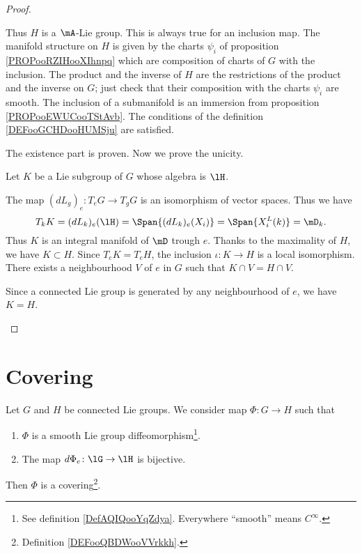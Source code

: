 \begin{theorem}
\begin{proof}
\begin{subproof}
		Thus \( H\) is a \( \mA\)-Lie group.
		This is always true for an inclusion map.
		The manifold structure on \( H\) is given by the charts \( \psi_i\) of proposition \ref{PROPooRZIHooXIhnpq} which are composition of charts of \( G\) with the inclusion. The product and the inverse of \( H\) are the restrictions of the product and the inverse on \( G\); just check that their composition with the charts \( \psi_i\) are smooth.
		The inclusion of a submanifold is an immersion from proposition \ref{PROPooEWUCooTStAvb}.
		The conditions of the definition \ref{DEFooGCHDooHUMSju} are satisfied.
	\end{subproof}
	The existence part is proven. Now we prove the unicity.

	Let \( K\) be a Lie subgroup of \( G\) whose algebra is \( \lH\).
	\begin{subproof}
		\spitem[\( T_kK=\mD_k\)]
		The map \( (dL_g)_e\colon T_eG\to T_gG\) is an isomorphism of vector spaces. Thus we have
		\begin{equation}
			T_kK=(dL_k)_e(\lH)=\Span\{ (dL_k)_e(X_i) \}=\Span\{ X_i^L(k) \}=\mD_k.
		\end{equation}
		\spitem[Maximality]
		Thus \( K\) is an integral manifold of \( \mD\) trough \( e\). Thanks to the maximality of \( H\), we have \( K\subset H\). Since \( T_eK=T_eH\), the inclusion \( \iota\colon K\to H\) is a local isomorphism. There exists a neighbourhood \( V\) of \( e\) in \( G\) such that \( K\cap V=H\cap V\).

		Since a connected Lie group is generated by any neighbourhood of \( e\), we have \( K=H\).
	\end{subproof}
\end{proof}


\section{Covering}

\begin{lemma}     \label{LEMooSYVQooTjkgBL}
	Let \( G\) and \( H\) be connected Lie groups. We consider map \( \Phi\colon G\to H\) such that
	\begin{enumerate}
		\item
		      \( \Phi\) is a smooth Lie group diffeomorphism\footnote{See definition \ref{DefAQIQooYqZdya}. Everywhere ``smooth'' means \(  C^{\infty}\).}.
		\item
		      The map \( d\Phi_e\colon \lG\to \lH\) is bijective.
	\end{enumerate}
	Then \( \Phi\) is a covering\footnote{Definition \ref{DEFooQBDWooVVrkkh}.}.
\end{lemma}


\end{theorem}
